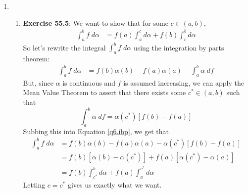 \documentclass[12pt]{article}
\theoremstyle{plain}
\theoremstyle{definition}
\theoremstyle{remark}
\begin{document}
\begin{enumerate}
\item 
\begin{enumerate}
\item \textbf{Exercise 55.5}: We want to show that for some $c\in(a,b)$,
\begin{align*}
    \int^b_a f\;d\alpha &= f(a)\int^c_a d\alpha 
        + f(b) \int^b_c d\alpha 
\end{align*}
So let's rewrite the integral $\int^b_a f\;d\alpha$ using the integration by parts theorem:
\begin{align}
    \label{q6.ibp}
    \int^b_a f\;d\alpha  
        &= f(b) \alpha(b) - f(a)\alpha(a) - \int^b_a\alpha \; df
\end{align}
But, since $\alpha$ is continuous and $f$ is assumed increasing, we can apply the Mean Value Theorem to assert that there exists some $c^*\in(a,b)$ such that 
\begin{equation}
    \int^b_a \alpha\;df = \alpha(c^*)[f(b)-f(a)]
\end{equation}
Subbing this into Equation \ref{q6.ibp}, we get that
\begin{align*}
    \int^b_a f\;d\alpha  
        &= f(b) \alpha(b)-f(a)\alpha(a)-\alpha(c^*)[f(b)-f(a)]\\
        &= f(b) \left[\alpha(b)-\alpha(c^*)\right]
            + f(a)\left[\alpha(c^*)-\alpha(a)\right]\\
        &= f(b) \int^b_{c^*} d\alpha
            + f(a)\int^{c^*}_a d\alpha
\end{align*}
Letting $c=c^*$ gives us exactly what we want.
\end{enumerate}



    
        
        

\end{enumerate}
\end{document}
